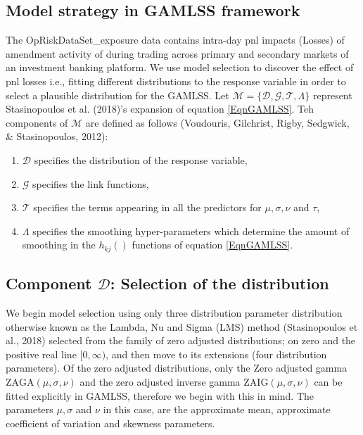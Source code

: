 \documentclass{DissertateUSU}
\begin{document}
\subsection{Model strategy in GAMLSS framework}

The OpRiskDataSet\_exposure data contains intra-day pnl impacts (Losses)
of amendment activity of during trading across primary and secondary
markets of an investment banking platform. We use model selection to
discover the effect of pnl losses i.e., fitting different distributions
to the response variable in order to select a plausible distribution for
the GAMLSS. Let
\(\mathcal{M}=\{\mathcal{D},\mathcal{G},\mathcal{T},\Lambda\}\)
represent Stasinopoulos et al. (2018)'s expansion of equation
\ref{EqnGAMLSS}. Teh components of \(\mathcal{M}\) are defined as
follows (Voudouris, Gilchrist, Rigby, Sedgwick, \& Stasinopoulos, 2012):

\begin{enumerate}
\item $\mathcal{D}$ specifies the distribution of the response variable,
\item $\mathcal{G}$ specifies the link functions,
\item $\mathcal{T}$ specifies the terms appearing in all the predictors for $\mu,\sigma,\nu$ and $\tau$,
\item $\Lambda$ specifies the smoothing hyper-parameters which determine the amount of smoothing in the $h_{kj}()$ functions of equation
\ref{EqnGAMLSS}.
\end{enumerate}

\subsection{Component $\mathcal{D}$: Selection of the distribution}

We begin model selection using only three distribution parameter
distribution otherwise known as the Lambda, Nu and Sigma (LMS) method
(Stasinopoulos et al., 2018) selected from the family of zero adjusted
distributions; on zero and the positive real line \([0,\infty)\), and
then move to its extensions (four distribution parameters). Of the zero
adjusted distributions, only the Zero adjusted gamma
\(\mbox{ZAGA}(\mu,\sigma,\nu )\) and the zero adjusted inverse gamma
\(\mbox{ZAIG}(\mu,\sigma,\nu )\) can be fitted explicitly in GAMLSS,
therefore we begin with this in mind. The parameters \(\mu,\sigma\) and
\(\nu\) in this case, are the approximate mean, approximate coefficient
of variation and skewness parameters.\medskip  
\end{document}
